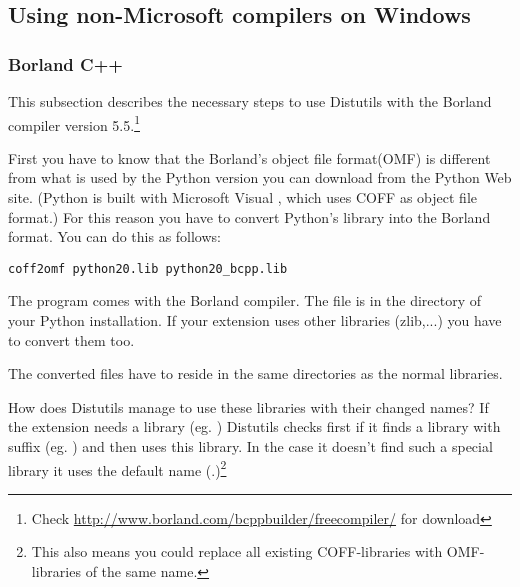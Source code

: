 \documentclass{howto}
\begin{document}


\subsection{Using non-Microsoft compilers on Windows \label{non-ms-compilers}}

\subsubsection{Borland C++}

This subsection describes the necessary steps to use Distutils with the 
Borland \Cpp{} compiler version 5.5.\footnote{Check
\url{http://www.borland.com/bcppbuilder/freecompiler/} for download}

First you have to know that the Borland's object file format(OMF) is
different from what is used by the Python version you can download
from the Python Web site.  (Python is built with Microsoft Visual \Cpp,
which uses COFF as object file format.)  For this reason you have to
convert Python's library  into the Borland format.
You can do this as follows:

\begin{verbatim}
coff2omf python20.lib python20_bcpp.lib
\end{verbatim}

The  program comes with the Borland compiler.  The file
 is in the  directory of your Python
installation.  If your extension uses other libraries (zlib,...) you
have to convert them too.

The converted files have to reside in the same directories as the
normal libraries.

How does Distutils manage to use these libraries with their changed
names?  If the extension needs a library (eg. ) Distutils
checks first if it finds a library with suffix 
(eg. ) and then uses this library.  In the case it
doesn't find such a special library it uses the default name
(.)\footnote{This also means you could replace all
existing COFF-libraries with OMF-libraries of the same name.}
\end{document}
